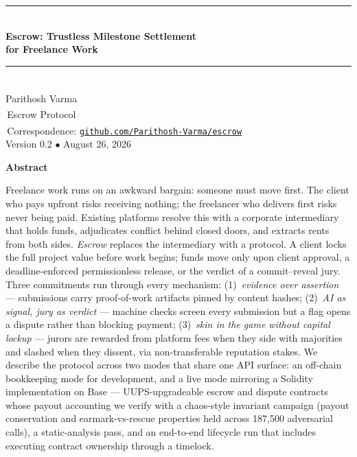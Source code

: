 \documentclass[11pt,letterpaper]{article}
\newenvironment{paperabstract}{%
  \begin{list}{}{\setlength{\leftmargin}{0.35in}\setlength{\rightmargin}{0.35in}}%
  \item\begin{center}\textbf{Abstract}\end{center}\small
}{\end{list}}
\newcommand{\titleruleblock}{\noindent\rule{\textwidth}{1.1pt}}
\begin{document}
\thispagestyle{empty}

\begin{center}
\vspace*{0.4in}
{\titleruleblock}\\[14pt]
{\huge\bfseries Escrow: Trustless Milestone Settlement\\[4pt] for Freelance Work}\\[12pt]
{\titleruleblock}\\[18pt]

{\large
Parithosh Varma\textsuperscript{\,\textdagger}\\[4pt]
\textsuperscript{\textdagger}\,Escrow Protocol\\[2pt]
\textsuperscript{\textdagger}\,Correspondence: \texttt{\href{https://github.com/Parithosh-Varma/escrow}{github.com/Parithosh-Varma/escrow}}\\[10pt]
{\normalsize\color{gray} Version 0.2 \; $\bullet$ \; August 26, 2026}
}
\end{center}

\vspace{0.15in}

\begin{paperabstract}
Freelance work runs on an awkward bargain: someone must move first. The client who
pays upfront risks receiving nothing; the freelancer who delivers first risks never
being paid. Existing platforms resolve this with a corporate intermediary that holds
funds, adjudicates conflict behind closed doors, and extracts rents from both sides.
\emph{Escrow} replaces the intermediary with a protocol. A client locks the full
project value before work begins; funds move only upon client approval, a
deadline-enforced permissionless release, or the verdict of a commit--reveal jury.
Three commitments run through every mechanism: (1)~\emph{evidence over assertion} ---
submissions carry proof-of-work artifacts pinned by content hashes; (2)~\emph{AI as
signal, jury as verdict} --- machine checks screen every submission but a flag opens a
dispute rather than blocking payment; (3)~\emph{skin in the game without capital
lockup} --- jurors are rewarded from platform fees when they side with majorities and
slashed when they dissent, via non-transferable reputation stakes. We describe the
protocol across two modes that share one API surface: an off-chain bookkeeping mode
for development, and a live mode mirroring a Solidity implementation on Base ---
UUPS-upgradeable escrow and dispute contracts whose payout accounting we verify with a
chaos-style invariant campaign (payout conservation and earmark-vs-rescue properties
held across 187{,}500 adversarial calls), a static-analysis pass, and an end-to-end
lifecycle run that includes executing contract ownership through a timelock.
\end{paperabstract}
\end{document}
